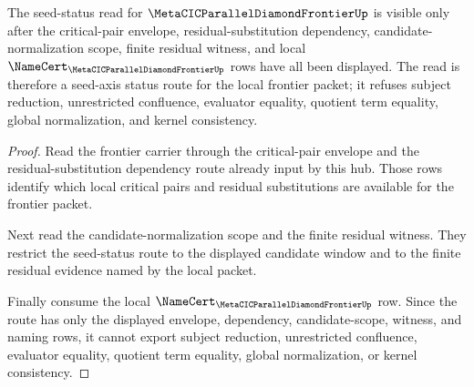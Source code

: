 \begin{lemma}
\label{lem:metacic-parallel-diamond-frontier-seed-status-visible}
The seed-status read for $\MetaCICParallelDiamondFrontierUp$ is visible only after the critical-pair envelope, residual-substitution dependency, candidate-normalization scope, finite residual witness, and local $\NameCert_{\MetaCICParallelDiamondFrontierUp}$ rows have all been displayed. The read is therefore a seed-axis status route for the local frontier packet; it refuses subject reduction, unrestricted confluence, evaluator equality, quotient term equality, global normalization, and kernel consistency.
\end{lemma}
\begin{proof}
Read the frontier carrier through the critical-pair envelope and the residual-substitution dependency route already input by this hub. Those rows identify which local critical pairs and residual substitutions are available for the frontier packet.

Next read the candidate-normalization scope and the finite residual witness. They restrict the seed-status route to the displayed candidate window and to the finite residual evidence named by the local packet.

Finally consume the local $\NameCert_{\MetaCICParallelDiamondFrontierUp}$ row. Since the route has only the displayed envelope, dependency, candidate-scope, witness, and naming rows, it cannot export subject reduction, unrestricted confluence, evaluator equality, quotient term equality, global normalization, or kernel consistency.
\end{proof}
